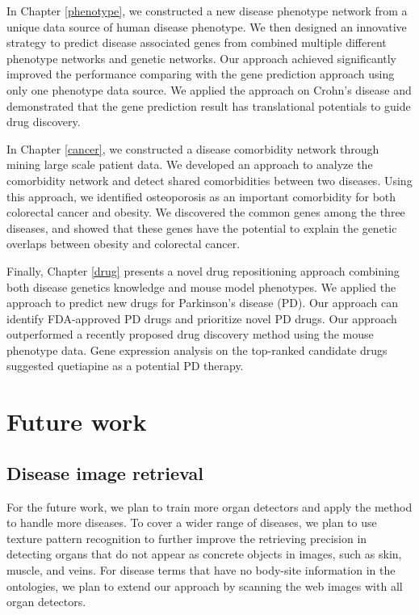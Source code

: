 In Chapter \ref{phenotype}, we constructed a new disease phenotype network
from a unique data source of human disease phenotype. We then 
designed an innovative strategy to predict disease associated genes
from combined multiple different phenotype networks and genetic networks.
Our approach achieved significantly improved the performance
comparing with the gene prediction approach using only one phenotype
data source. We applied the approach on Crohn's disease and demonstrated that the gene prediction result
has translational potentials to guide drug discovery.

In Chapter \ref{cancer}, we constructed a disease comorbidity network 
through mining large scale patient data. We developed an approach to 
analyze the comorbidity network and detect shared comorbidities between two diseases.
Using this approach, we identified osteoporosis as an important comorbidity for both
colorectal cancer and obesity. We discovered the common genes among the three diseases,
and showed that these genes have the potential to explain the genetic overlaps between obesity and colorectal cancer.

Finally, Chapter \ref{drug} presents a novel drug repositioning approach combining 
both disease genetics knowledge and mouse model phenotypes. We applied the approach
to predict new drugs for Parkinson's disease (PD). Our approach can identify FDA-approved 
PD drugs and prioritize novel PD drugs. Our approach outperformed a recently proposed 
drug discovery method using the mouse phenotype data. Gene expression analysis 
on the top-ranked candidate drugs suggested quetiapine as a potential PD therapy.

\section{Future work}
\subsection{Disease image retrieval}
For the future work, we plan to train more organ detectors and apply the
method to handle more diseases. To cover a wider range of diseases,
we plan to use texture pattern recognition to further improve the
retrieving precision in detecting organs that do not appear as concrete objects in images, 
such as skin, muscle, and veins.
For disease terms that have no body-site information in the ontologies, 
we plan to extend our approach by scanning the web images with all organ detectors. 

